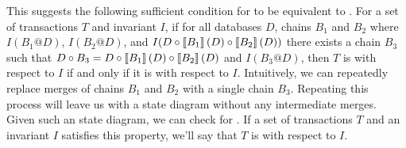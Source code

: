 This suggests the following sufficient condition for \liconfluence{} to be
equivalent to \iconfluence{}. For a set of transactions $T$ and invariant $I$,
if for all databases $D$, chains $B_1$ and $B_2$ where $I(B_1@D)$, $I(B_2@D)$,
and $I(D \circ \left\llbracket B_1\right\rrbracket(D) \circ \left\llbracket B_2\right\rrbracket(D))$ there exists a chain
$B_3$ such that $D \circ B_3 = D \circ \left\llbracket B_1\right\rrbracket(D) \circ \left\llbracket B_2\right\rrbracket(D)$
and $I(B_3@D)$, then $T$ is \liconfluent{} with respect to $I$ if and only if
it is \iconfluent{} with respect to $I$. Intuitively, we can repeatedly replace
merges of chains $B_1$ and $B_2$ with a single chain $B_3$. Repeating this
process will leave us with a state diagram without any intermediate merges.
Given such an state diagram, we can check for \liconfluence{}. If a set of
transactions $T$ and an invariant $I$ satisfies this property, we'll say that
$T$ is \ireplayable{} with respect to $I$.


%
